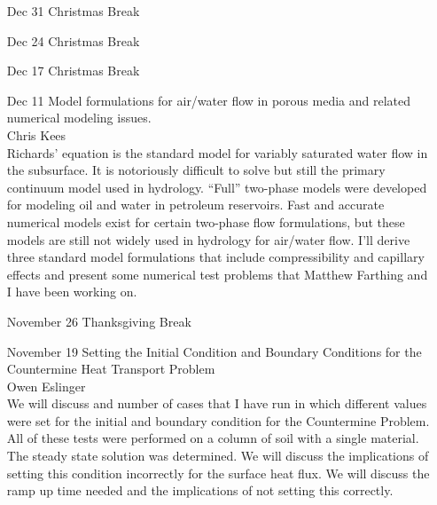 \documentclass[12]{article}
\begin{document}
\begin{enumerate}

\item[Dec 31] Christmas Break

\item[Dec 24] Christmas Break

\item[Dec 17] Christmas Break

\item[Dec 11] Model formulations for air/water flow in porous media and related numerical modeling issues.\\ Chris Kees\\
  Richards' equation is the standard model for variably saturated water flow in the subsurface.  It is notoriously difficult to solve but still the primary continuum model used in hydrology.  ``Full'' two-phase models were developed for modeling oil and water in petroleum reservoirs.  Fast and accurate numerical models exist for certain two-phase flow formulations, but these models are still not widely used in hydrology for air/water flow.  I'll derive three standard model formulations that include compressibility and capillary effects and present some numerical test problems that Matthew Farthing and I have been working on.


\item[November 26] Thanksgiving Break

\item[November 19] Setting the Initial Condition and Boundary Conditions for the Countermine Heat Transport Problem\\ Owen Eslinger\\
  We will discuss and number of cases that I have run in which different values were set for the initial and boundary condition for the Countermine Problem.  All of these tests were performed on a column of soil with a single material.  The steady state solution was determined.  We will discuss the implications of setting this condition incorrectly for the surface heat flux.  We will discuss the ramp up time needed and the implications of not setting this correctly.


\end{enumerate}
\end{document}

